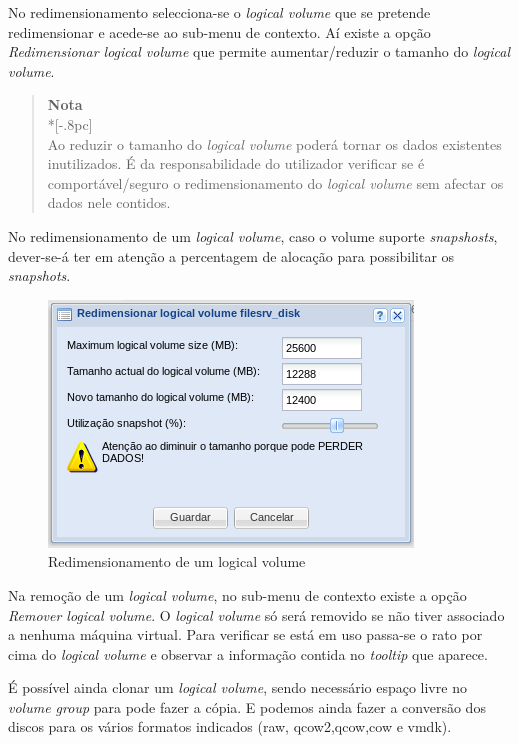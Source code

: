 No redimensionamento selecciona-se o \emph{logical volume} que se pretende redimensionar e acede-se ao sub-menu de contexto. Aí existe a opção \emph{Redimensionar logical volume} que permite aumentar/reduzir o tamanho do \emph{logical volume}.


\begin{quote}
	{\large \bf Nota} \\*[-.8pc]
	\underline{\hspace{6in}} \\
	Ao reduzir o tamanho do \emph{logical volume} poderá tornar os dados existentes inutilizados. É da responsabilidade do utilizador verificar se é comportável/seguro o redimensionamento do \emph{logical volume} sem afectar os dados nele contidos.
\end{quote}

No redimensionamento de um \emph{logical volume}, caso o volume suporte \emph{snapshosts}, dever-se-á ter em atenção a percentagem de alocação para possibilitar os \emph{snapshots}.

\begin{figure}[H]
        \begin{center}
        \includegraphics[scale=0.5]{screenshots/storage_lv_resize.png}
        \caption{Redimensionamento de um logical volume}
        \label{fig:storage_lv_resize}
        \end{center}
\end{figure}

Na remoção de um \emph{logical volume}, no sub-menu de contexto existe a opção \emph{Remover logical volume}. O \emph{logical volume} só será removido se não tiver associado a nenhuma máquina virtual. Para verificar se está em uso passa-se o rato por cima do \emph{logical volume} e observar a informação contida no \emph{tooltip} que aparece.

É possível ainda clonar um \emph{logical volume}, sendo necessário espaço livre no \emph{volume group} para pode fazer a cópia.
E podemos ainda fazer a conversão dos discos para os vários formatos indicados (raw, qcow2,qcow,cow e vmdk).

